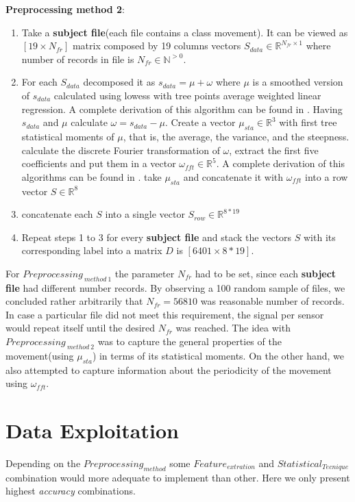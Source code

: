 \textbf{Preprocessing method 2}:
\begin{enumerate}
	\item Take a \textbf{subject file}(each file contains a class movement). It can be viewed as $[19 \times N_{fr}]$ matrix composed by 19 columns vectors $S_{data} \in \mathbb{R}^{N_{fr} \times 1}$  where number of records in file is $N_{fr} \in \mathbb{N}^{>0}$.
	\item For each $S_{data}$ decomposed it as $s_{data}=\mu+\omega$ where $\mu$ is a smoothed version of $s_{data}$ calculated using lowess with tree points average weighted linear regression. A complete derivation of this algorithm can be found in \cite{1}. Having $s_{data}$ and $\mu$ calculate $\omega =s_{data}-\mu$. Create a vector $\mu_{sta} \in \mathbb{R}^{3}$ with first tree statistical moments of $\mu$, that is, the average, the variance, and the steepness. calculate the discrete Fourier transformation of $\omega$, extract the first five coefficients and put them in a vector $\omega_{fft} \in \mathbb{R}^{5}$. A complete derivation of this algorithms can be found in \cite{2}.
	take $\mu_{sta}$ and concatenate it with $\omega_{fft}$ into a row vector $S \in \mathbb{R}^{8}$
	\item concatenate each $S$ into a single vector $S_{row} \in \mathbb{R}^{8*19}$
	\item Repeat steps 1 to 3 for every \textbf{subject file} and stack the vectors $S$ with its corresponding label into a matrix $D$ is $[6401 \times 8*19]$.
\end{enumerate}

 For $Preprocessing_{ \ method \ 1}$ the parameter $N_{fr}$ had to be set, since each \textbf{subject file} had different number records. By observing a 100 random sample of files, we concluded rather arbitrarily that  $N_{fr}=56810$  was reasonable number of records. In case a particular file did not meet this requirement, the signal per sensor would repeat itself until the desired $N_{fr}$ was reached. The idea with $Preprocessing_{ \ method \ 2}$ was to capture the general properties of the movement(using $\mu_{sta}$) in terms of its statistical moments. On the other hand, we also attempted to capture information about the periodicity of the movement using $\omega_{fft}$. 


\section{Data Exploitation}

Depending on the $Preprocessing_{method}$ some $Feature_{extration}$ and $Statistical_{Tecnique}$ combination would more adequate to implement than other. Here we only present highest \textit{accuracy} combinations. 

